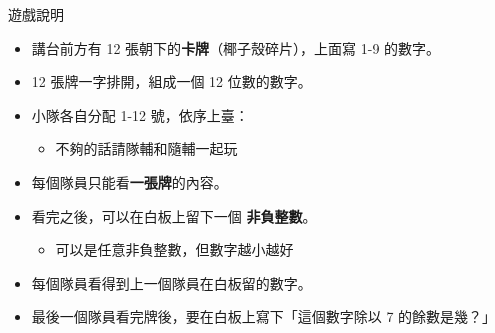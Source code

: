 \begin{frame}{遊戲說明}
  \begin{itemize}
    \item 講台前方有 12 張朝下的\textbf{卡牌}（椰子殼碎片），上面寫 1-9 的數字。
    \item 12 張牌一字排開，組成一個 12 位數的數字。
    \item 小隊各自分配 1-12 號，依序上臺：
    \begin{itemize}
      \item 不夠的話請隊輔和隨輔一起玩 
    \end{itemize}
      \item 每個隊員只能看\textbf{一張牌}的內容。
      \item 看完之後，可以在白板上留下一個 \textbf{非負整數}。
      \begin{itemize}
        \item 可以是任意非負整數，但數字越小越好
      \end{itemize}
      \item 每個隊員看得到上一個隊員在白板留的數字。
      \item 最後一個隊員看完牌後，要在白板上寫下「這個數字除以 7 的餘數是幾？」
  \end{itemize}
\end{frame}



